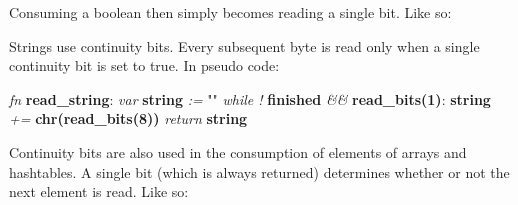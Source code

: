 Consuming a boolean then simply becomes reading a single bit. Like so:

\begin{changemargin}{-60mm}{0mm}
\end{changemargin}

Strings use continuity bits. Every subsequent byte is read only when a
single continuity bit is set to true. In pseudo code:

\begin{changemargin}{-60mm}{0mm}
\begin{myquote}

\vbox{
\textit{fn} \textbf{read\_string}: \newline
\indent\hspace{.5cm} \textit{var} \textbf{string} \textit{:=} "" \newline
\indent\hspace{.5cm} \textit{while !} \textbf{finished} \textit{\&\&} \textbf{read\_bits(1)}: \newline
\indent\hspace{1cm} \textbf{string} \textit{+=} \textbf{chr(read\_bits(8))} \newline
\indent\hspace{.5cm} \textit{return} \textbf{string} \newline
}

\end{myquote}
\end{changemargin}

Continuity bits are also used in the consumption of elements of arrays
and hashtables. A single bit (which is always returned) determines whether
or not the next element is read. Like so:

